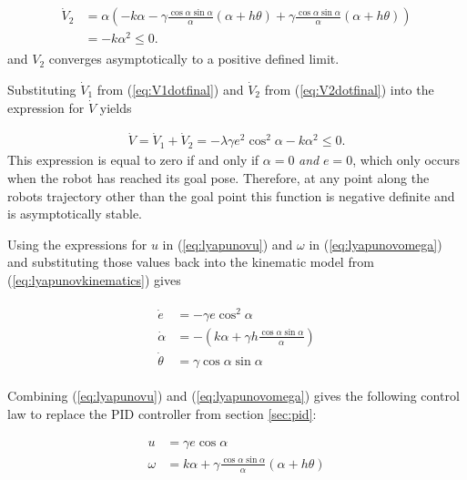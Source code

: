 \begin{align}
\label{eq:V2dotfinal}
\begin{split}
\dot{V}_2 &= \alpha\left(-k\alpha-\gamma\frac{\cos\alpha\sin\alpha}{\alpha}(\alpha+h\theta) + \gamma\frac{\cos\alpha\sin\alpha}{\alpha}(\alpha+h\theta)\right) \\
&= -k\alpha^2 \leq 0.
\end{split}
\end{align}
and $V_2$ converges asymptotically to a positive defined limit.

Substituting $\dot{V}_1$ from (\ref{eq:V1dotfinal}) and $\dot{V}_2$ from (\ref{eq:V2dotfinal}) into the expression for $\dot{V}$ yields

\begin{align}
\label{eq:Vfinal}
\dot{V} = \dot{V}_1 + \dot{V}_2 = -\lambda\gamma e^2\cos^2\alpha - k\alpha^2 \leq 0.
\end{align}
This expression is equal to zero if and only if $\alpha=0$ \textit{and} $e=0$, which only occurs when the robot has reached its goal pose. Therefore, at any point along the robots trajectory other than the goal point this function is negative definite and is asymptotically stable.

Using the expressions for $u$ in (\ref{eq:lyapunovu}) and $\omega$ in (\ref{eq:lyapunovomega}) and substituting those values back into the kinematic model from (\ref{eq:lyapunovkinematics}) gives

\begin{align}
\label{eq:lyapunovfinalkinematics}
\begin{split}
\dot{e} &= -\gamma e\cos^2\alpha \\
\dot{\alpha} &= -\left(k\alpha + \gamma h\frac{\cos\alpha\sin\alpha}{\alpha}\right) \\
\dot{\theta} &= \gamma\cos\alpha\sin\alpha
\end{split}
\end{align}

Combining (\ref{eq:lyapunovu}) and (\ref{eq:lyapunovomega}) gives the following control law to replace the PID controller from section \ref{sec:pid}:

\begin{align}
\label{eq:lyapunovControlLaw}
\begin{split}
u &= \gamma e\cos\alpha \\
\omega &= k\alpha + \gamma\frac{\cos\alpha\sin\alpha}{\alpha}\left(\alpha+h\theta\right)
\end{split}
\end{align}


